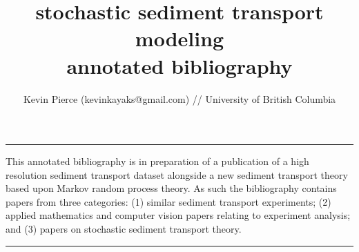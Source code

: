 \documentclass [11pt]{article}
\title{\textbf{stochastic sediment transport modeling} \\ annotated bibliography}
\author{Kevin Pierce (kevinkayaks@gmail.com) // University of British Columbia}
\date{}
\begin{document}
\maketitle
\vspace{-1cm}
\noindent\rule{\textwidth}{1pt}
\vspace{-0.25cm}

\noindent This annotated bibliography is in preparation of a publication of a high resolution sediment transport dataset alongside a new sediment transport theory based upon Markov random process theory. As such the bibliography contains papers from three categories: (1) similar sediment transport experiments; (2) applied mathematics and computer vision papers relating to experiment analysis; and (3) papers on stochastic sediment transport theory.\\  
\noindent\rule{\textwidth}{1pt}

\nocite{*}


\end{document}
